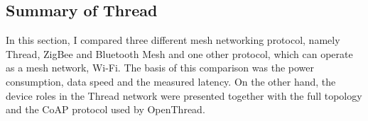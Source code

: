 \subsection{Summary of Thread}
In this section, I compared three different mesh networking protocol, namely Thread, ZigBee and Bluetooth Mesh and one other protocol, which can operate as a mesh network, Wi-Fi. The basis of this comparison was the power consumption, data speed and the measured latency. On the other hand, the device roles in the Thread network were presented together with the full topology and the CoAP protocol used by OpenThread.